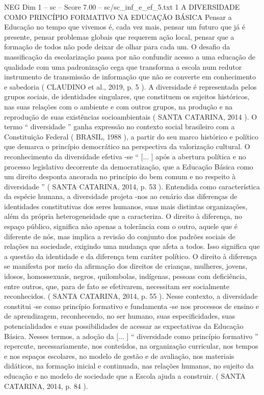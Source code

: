 \begin{textsample}{NEG Dim 1 – sc – Score 7.00 – sc/sc\_inf\_e\_ef\_5.txt}  \label{ex:f1_neg_274}
1 A DIVERSIDADE COMO PRINCÍPIO FORMATIVO NA EDUCAÇÃO BÁSICA Pensar a Educação no tempo que vivemos é, cada vez mais, pensar um futuro que já é presente, pensar problemas globais que requerem ação local, pensar que a formação de todos não pode deixar de olhar para cada um.
O desafio da massificação da escolarização passa por não confundir acesso a uma educação de qualidade com uma padronização cega que transforma a escola num redutor instrumento de transmissão de informação que não se converte em conhecimento e sabedoria ( CLAUDINO et al., 2019, p. 5 ).
A diversidade é representada pelos grupos sociais, de identidades singulares, que constituem os sujeitos históricos, nas suas relações com o ambiente e com outros grupos, na produção e na reprodução de suas existências socioambientais ( SANTA CATARINA, 2014 ).
O termo “ diversidade ” ganha expressão no contexto social brasileiro com a Constituição Federal ( BRASIL, 1988 ), a partir do seu marco histórico e político que demarca o princípio democrático na perspectiva da valorização cultural.
O reconhecimento da diversidade efetiva -se “ [... ] após a abertura política e no processo legislativo decorrente da democratização, que a Educação Básica como um direito desponta ancorada no princípio do bem comum e no respeito à diversidade ” ( SANTA CATARINA, 2014, p. 53 ).
Entendida como característica da espécie humana, a diversidade projeta -nos ao cenário das diferenças de identidades constitutivas dos seres humanos, suas mais distintas organizações, além da própria heterogeneidade que a caracteriza.
O direito à diferença, no espaço público, significa não apenas a tolerância com o outro, aquele que é diferente de nós, mas implica a revisão do conjunto dos padrões sociais de relações na sociedade, exigindo uma mudança que afeta a todos.
Isso significa que a questão da identidade e da diferença tem caráter político.
O direito à diferença se manifesta por meio da afirmação dos direitos de crianças, mulheres, jovens, idosos, homossexuais, negros, quilombolas, indígenas, pessoas com deficiência, entre outros, que, para de fato se efetivarem, necessitam ser socialmente reconhecidos. ( SANTA CATARINA, 2014, p. 55 ).
Nesse contexto, a diversidade constitui -se como princípio formativo e fundamenta -se nos processos de ensino e de aprendizagem, reconhecendo, no ser humano, suas especificidades, suas potencialidades e suas possibilidades de acessar as expectativas da Educação Básica.
Nesses termos, a adoção da [... ] “ diversidade como princípio formativo ” repercute, necessariamente, nos conteúdos, na organização curricular, nos tempos e nos espaços escolares, no modelo de gestão e de avaliação, nos materiais didáticos, na formação inicial e continuada, nas relações humanas, no sujeito da educação e no modelo de sociedade que a Escola ajuda a construir. ( SANTA CATARINA, 2014, p. 84 ).

\end{textsample}
